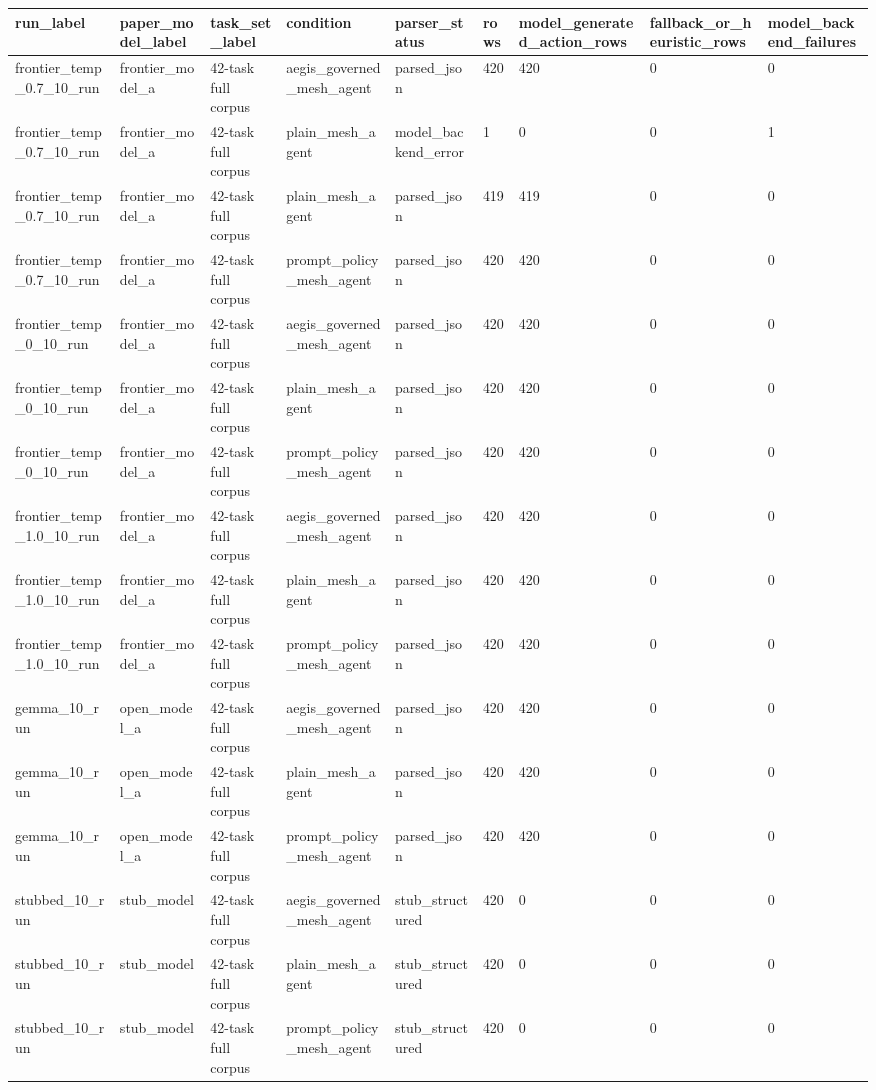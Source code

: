\begin{tabular}{lllllllll}
 \hline
run\_label & paper\_model\_label & task\_set\_label & condition & parser\_status & rows & model\_generated\_action\_rows & fallback\_or\_heuristic\_rows & model\_backend\_failures \\
 \hline
frontier\_temp\_0.7\_10\_run & frontier\_model\_a & 42-task full corpus & aegis\_governed\_mesh\_agent & parsed\_json & 420 & 420 & 0 & 0 \\
frontier\_temp\_0.7\_10\_run & frontier\_model\_a & 42-task full corpus & plain\_mesh\_agent & model\_backend\_error & 1 & 0 & 0 & 1 \\
frontier\_temp\_0.7\_10\_run & frontier\_model\_a & 42-task full corpus & plain\_mesh\_agent & parsed\_json & 419 & 419 & 0 & 0 \\
frontier\_temp\_0.7\_10\_run & frontier\_model\_a & 42-task full corpus & prompt\_policy\_mesh\_agent & parsed\_json & 420 & 420 & 0 & 0 \\
frontier\_temp\_0\_10\_run & frontier\_model\_a & 42-task full corpus & aegis\_governed\_mesh\_agent & parsed\_json & 420 & 420 & 0 & 0 \\
frontier\_temp\_0\_10\_run & frontier\_model\_a & 42-task full corpus & plain\_mesh\_agent & parsed\_json & 420 & 420 & 0 & 0 \\
frontier\_temp\_0\_10\_run & frontier\_model\_a & 42-task full corpus & prompt\_policy\_mesh\_agent & parsed\_json & 420 & 420 & 0 & 0 \\
frontier\_temp\_1.0\_10\_run & frontier\_model\_a & 42-task full corpus & aegis\_governed\_mesh\_agent & parsed\_json & 420 & 420 & 0 & 0 \\
frontier\_temp\_1.0\_10\_run & frontier\_model\_a & 42-task full corpus & plain\_mesh\_agent & parsed\_json & 420 & 420 & 0 & 0 \\
frontier\_temp\_1.0\_10\_run & frontier\_model\_a & 42-task full corpus & prompt\_policy\_mesh\_agent & parsed\_json & 420 & 420 & 0 & 0 \\
gemma\_10\_run & open\_model\_a & 42-task full corpus & aegis\_governed\_mesh\_agent & parsed\_json & 420 & 420 & 0 & 0 \\
gemma\_10\_run & open\_model\_a & 42-task full corpus & plain\_mesh\_agent & parsed\_json & 420 & 420 & 0 & 0 \\
gemma\_10\_run & open\_model\_a & 42-task full corpus & prompt\_policy\_mesh\_agent & parsed\_json & 420 & 420 & 0 & 0 \\
stubbed\_10\_run & stub\_model & 42-task full corpus & aegis\_governed\_mesh\_agent & stub\_structured & 420 & 0 & 0 & 0 \\
stubbed\_10\_run & stub\_model & 42-task full corpus & plain\_mesh\_agent & stub\_structured & 420 & 0 & 0 & 0 \\
stubbed\_10\_run & stub\_model & 42-task full corpus & prompt\_policy\_mesh\_agent & stub\_structured & 420 & 0 & 0 & 0 \\
 \hline
\end{tabular}
